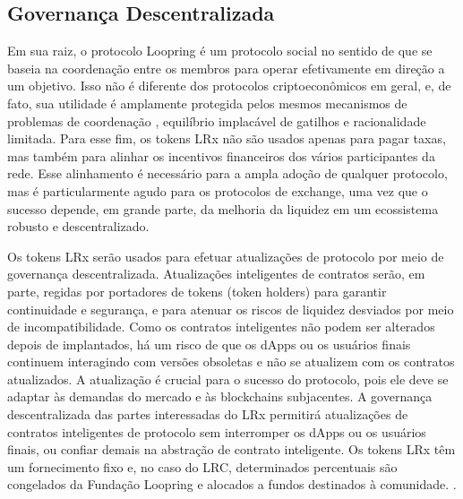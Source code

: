 \documentclass[UTF8,nofonts]{article}
\begin{document}
\begin{multicols}{2}
\subsection{Governança Descentralizada}
Em sua raiz, o protocolo Loopring é um protocolo social no sentido de que se baseia na coordenação entre os membros para operar efetivamente em direção a um objetivo. Isso não é diferente dos protocolos criptoeconômicos em geral, e, de fato, sua utilidade é amplamente protegida pelos mesmos mecanismos de problemas de coordenação \cite{vitalikgovernance}, equilíbrio implacável de gatilhos e racionalidade limitada. Para esse fim, os tokens LRx não são usados apenas para pagar taxas, mas também para alinhar os incentivos financeiros dos vários participantes da rede. Esse alinhamento é necessário para a ampla adoção de qualquer protocolo, mas é particularmente agudo para os protocolos de exchange, uma vez que o sucesso depende, em grande parte, da melhoria da liquidez em um ecossistema robusto e descentralizado.

Os tokens LRx serão usados para efetuar atualizações de protocolo por meio de governança descentralizada. Atualizações inteligentes de contratos serão, em parte, regidas por portadores de tokens (token holders) para garantir continuidade e segurança, e para atenuar os riscos de liquidez desviados por meio de incompatibilidade. Como os contratos inteligentes não podem ser alterados depois de implantados, há um risco de que os dApps ou os usuários finais continuem interagindo com versões obsoletas e não se atualizem com os contratos atualizados. A atualização é crucial para o sucesso do protocolo, pois ele deve se adaptar às demandas do mercado e às blockchains subjacentes. A governança descentralizada das partes interessadas do LRx permitirá atualizações de contratos inteligentes de protocolo sem interromper os dApps ou os usuários finais, ou confiar demais na abstração de contrato inteligente. Os tokens LRx têm um fornecimento fixo e, no caso do LRC, determinados percentuais são congelados da Fundação Loopring e alocados a fundos destinados à comunidade. \cite{LRCtokendoc}.


\end{multicols}
\end{document}
